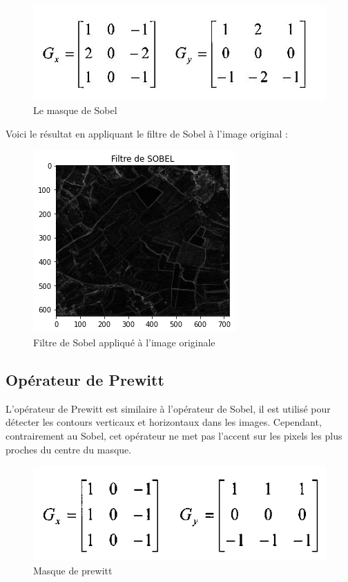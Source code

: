 \documentclass[12pt, openany]{report}
\begin{document}
\begin{figure}[H]
\centering
\includegraphics[scale=0.9]{sobel_masque.jpg}
\caption{Le masque de Sobel}
\end{figure}

Voici le résultat en appliquant le filtre de Sobel à l'image original :

\begin{figure}[H]
\centering
\includegraphics[scale=0.9]{sobel_result.png}
\caption{Filtre de Sobel appliqué à l'image originale}
\end{figure}


\subsection{Opérateur de Prewitt}
L'opérateur de Prewitt est similaire à l'opérateur de Sobel, il est utilisé pour détecter les contours verticaux et horizontaux dans les images. Cependant, contrairement au Sobel, cet opérateur ne met pas l'accent sur les pixels les plus proches du centre du masque.

\begin{figure}[H]
\centering
\includegraphics[scale=0.9]{prewit_masque.png}
\caption{Masque de prewitt}
\end{figure}
\end{document}
